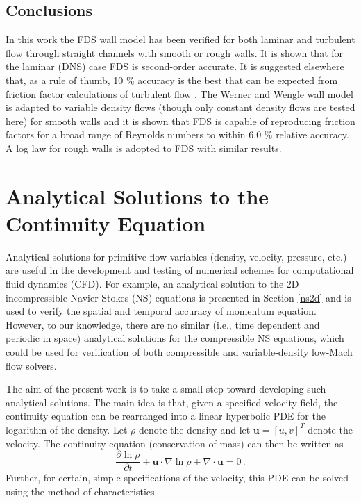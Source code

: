 \documentclass[11pt]{book}
\begin{document}
\subsection{Conclusions}
\label{conclusions}

In this work the FDS wall model has been verified for both laminar and turbulent flow through straight channels with smooth or rough walls.  It is shown that for the laminar (DNS) case FDS is second-order accurate.  It is suggested elsewhere that, as a rule of thumb, 10 \% accuracy is the best that can be expected from friction factor calculations of turbulent flow \cite{MYO}.  The Werner and Wengle wall model is adapted to variable density flows (though only constant density flows are tested here) for smooth walls and it is shown that FDS is capable of reproducing friction factors for a broad range of Reynolds numbers to within 6.0 \% relative accuracy.  A log law for rough walls is adopted to FDS with similar results.

\clearpage

\section{Analytical Solutions to the Continuity Equation}

Analytical solutions for primitive flow variables (density, velocity, pressure, etc.) are useful in the development and testing of numerical schemes for computational fluid dynamics (CFD).  For example, an analytical solution to the 2D incompressible Navier-Stokes (NS) equations is presented in Section \ref{ns2d} and is used to verify the spatial and temporal accuracy of momentum equation.  However, to our knowledge, there are no similar (i.e., time dependent and periodic in space) analytical solutions for the compressible NS equations, which could be used for verification of both compressible and variable-density low-Mach flow solvers.

The aim of the present work is to take a small step toward developing such analytical solutions.  The main idea is that, given a specified velocity field, the continuity equation can be rearranged into a linear hyperbolic PDE for the logarithm of the density.  Let $\rho$ denote the density and let $\mathbf{u} = [u,v]^T$ denote the velocity. The continuity equation (conservation of mass) can then be written as
\begin{equation}
\label{eqn_continuity}
\frac{\partial \ln \rho}{\partial t} + \mathbf{u} \cdot \nabla \ln \rho + \nabla\cdot \mathbf{u} = 0 \,\mbox{.}
\end{equation}
Further, for certain, simple specifications of the velocity, this PDE can be solved using the method of characteristics.
\end{document}
